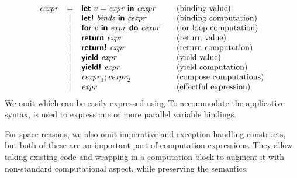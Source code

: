 \documentclass[runningheads,a4paper]{llncs}
\begin{document}
\begin{equation*}
\begin{array}{lclcl}
\cexpr &=& \kvd{let}~v=\expr~\kvd{in}~\cexpr                &&\textnormal{(binding value)} \\
       &|& \kvd{let!}~\binds~\kvd{in}~\cexpr                &&\textnormal{(binding computation)} \\
       &|& \kvd{for}~v~\kvd{in}~\expr~\kvd{do}~\cexpr       &&\textnormal{(for loop computation)} \\
       &|& \kvd{return}~\expr                               &&\textnormal{(return value)} \\
       &|& \kvd{return!}~\expr                              &&\textnormal{(return computation)} \\
       &|& \kvd{yield}~\expr                                &&\textnormal{(yield value)} \\
       &|& \kvd{yield!}~\expr                               &&\textnormal{(yield computation)} \\
       &|& \cexpr_1; \cexpr_2                               &&\textnormal{(compose computations)} \\       
       &|& \expr                                            &&\textnormal{(effectful expression)} \\
\end{array}
\end{equation*}
%
We omit  which can be easily expressed using  To accommodate the applicative 
syntax, \binds\; is used to express one or more parallel variable bindings. 

For space reasons, we also omit imperative  and exception handling 
constructs, but both of these are an important part of computation expressions. They allow
taking existing code and wrapping in a computation block to augment it with non-standard
computational aspect, while preserving the semantics.

\end{document}
